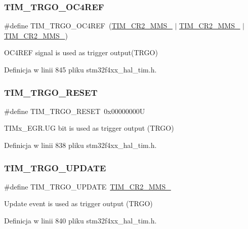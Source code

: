 \subsubsection{\texorpdfstring{T\+I\+M\+\_\+\+T\+R\+G\+O\+\_\+\+O\+C4\+R\+EF}{TIM\_TRGO\_OC4REF}}
{\footnotesize\ttfamily \#define T\+I\+M\+\_\+\+T\+R\+G\+O\+\_\+\+O\+C4\+R\+EF~(\hyperlink{group___peripheral___registers___bits___definition_gacb74a815afdd856d51cfcf1ddf3fce6a}{T\+I\+M\+\_\+\+C\+R2\+\_\+\+M\+M\+S\+\_} $\vert$ \hyperlink{group___peripheral___registers___bits___definition_ga4b1036929b0a4ba5bd5cced9b8e0f4c3}{T\+I\+M\+\_\+\+C\+R2\+\_\+\+M\+M\+S\+\_} $\vert$ \hyperlink{group___peripheral___registers___bits___definition_gaf3e55308e84106d6501201e66bd46ab6}{T\+I\+M\+\_\+\+C\+R2\+\_\+\+M\+M\+S\+\_})}

O\+C4\+R\+EF signal is used as trigger output(\+T\+R\+G\+O) 

Definicja w linii 845 pliku stm32f4xx\+\_\+hal\+\_\+tim.\+h.

\mbox{\label{group___t_i_m___master___mode___selection_ga32a8e436f2c0818a657b0d3fcf4e872d}} 
\subsubsection{\texorpdfstring{T\+I\+M\+\_\+\+T\+R\+G\+O\+\_\+\+R\+E\+S\+ET}{TIM\_TRGO\_RESET}}
{\footnotesize\ttfamily \#define T\+I\+M\+\_\+\+T\+R\+G\+O\+\_\+\+R\+E\+S\+ET~0x00000000U}

T\+I\+Mx\+\_\+\+E\+G\+R.\+UG bit is used as trigger output (T\+R\+GO) 

Definicja w linii 838 pliku stm32f4xx\+\_\+hal\+\_\+tim.\+h.

\mbox{\label{group___t_i_m___master___mode___selection_ga27521aebd507e562fe7fba6dfc639a67}} 
\subsubsection{\texorpdfstring{T\+I\+M\+\_\+\+T\+R\+G\+O\+\_\+\+U\+P\+D\+A\+TE}{TIM\_TRGO\_UPDATE}}
{\footnotesize\ttfamily \#define T\+I\+M\+\_\+\+T\+R\+G\+O\+\_\+\+U\+P\+D\+A\+TE~\hyperlink{group___peripheral___registers___bits___definition_ga4b1036929b0a4ba5bd5cced9b8e0f4c3}{T\+I\+M\+\_\+\+C\+R2\+\_\+\+M\+M\+S\+\_}}

Update event is used as trigger output (T\+R\+GO) 

Definicja w linii 840 pliku stm32f4xx\+\_\+hal\+\_\+tim.\+h.

